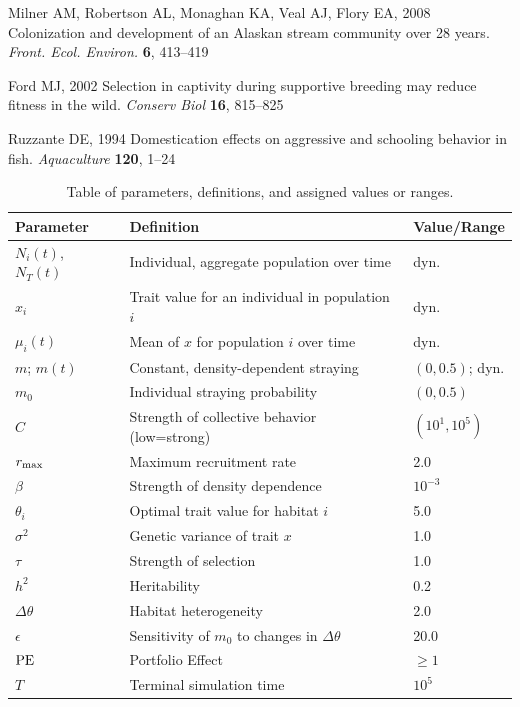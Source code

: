 \documentclass{revtex4}
\begin{document}
\begin{thebibliography}{10}
Milner AM, Robertson AL, Monaghan KA, Veal AJ, Flory EA, 2008 {Colonization and
  development of an Alaskan stream community over 28 years}.
\newblock \emph{Front. Ecol. Environ.} \textbf{6}, 413--419

Ford MJ, 2002 {Selection in captivity during supportive breeding may reduce
  fitness in the wild}.
\newblock \emph{Conserv Biol} \textbf{16}, 815--825

Ruzzante DE, 1994 {Domestication effects on aggressive and schooling behavior
  in fish}.
\newblock \emph{Aquaculture} \textbf{120}, 1--24

\end{thebibliography}


\clearpage

\begin{table}[!t]
\begin{center}
\begin{tabular}{ l l l }
\hline
Parameter & Definition & Value/Range \\
\hline
$N_i(t)$, $N_T(t)$ & Individual, aggregate population over time & dyn.\\
$x_i$ & Trait value for an individual in population $i$ & dyn.\\
$\mu_i(t)$ & Mean of $x$ for population $i$ over time & dyn.\\
$m$; $m(t)$ & Constant, density-dependent straying & $(0,0.5)$; dyn.\\
$m_0$ & Individual straying probability & $(0,0.5)$\\
$C$ & Strength of collective behavior (low=strong) & $(10^1,10^5)$\\
$r_{\rm max}$ & Maximum recruitment rate & 2.0 \\
$\beta$ & Strength of density dependence & $10^{-3}$\\
$\theta_i$ & Optimal trait value for habitat $i$ & 5.0\\
$\sigma^2$ & Genetic variance of trait $x$ & 1.0\\
$\tau$ & Strength of selection & 1.0\\
$h^2$ & Heritability & 0.2\\
$\Delta\theta$ & Habitat heterogeneity & 2.0\\
$\epsilon$ & Sensitivity of $m_0$ to changes in $\Delta\theta$ & 20.0\\
${\rm PE}$ & Portfolio Effect & $\geq1$\\
$T$ & Terminal simulation time & $10^5$\\
\hline
\end{tabular}
\end{center}
\caption{Table of parameters, definitions, and assigned values or ranges.}
\end{table}
\end{document}
